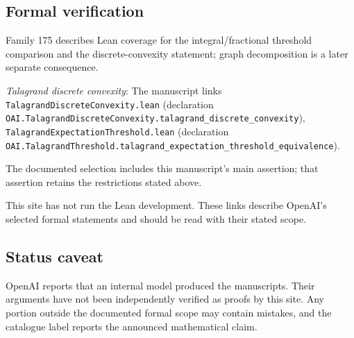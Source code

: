 \documentclass[11pt]{article}
\begin{document}
\subsection{Formal verification}
Family 175 describes Lean coverage for the integral/fractional threshold comparison and the discrete-convexity statement; graph decomposition is a later separate consequence.

\textit{Talagrand discrete convexity}: The manuscript links \texttt{TalagrandDiscreteConvexity.lean} (declaration \texttt{OAI.TalagrandDiscreteConvexity.talagrand\_discrete\_convexity}), \texttt{TalagrandExpectationThreshold.lean} (declaration \texttt{OAI.TalagrandThreshold.talagrand\_expectation\_threshold\_equivalence}).

The documented selection includes this manuscript’s main assertion; that assertion retains the restrictions stated above.

This site has not run the Lean development. These links describe OpenAI’s selected formal statements and should be read with their stated scope.

\subsection{Status caveat}
OpenAI reports that an internal model produced the manuscripts. Their arguments have not been independently verified as proofs by this site. Any portion outside the documented formal scope may contain mistakes, and the catalogue label reports the announced mathematical claim.
\end{document}
